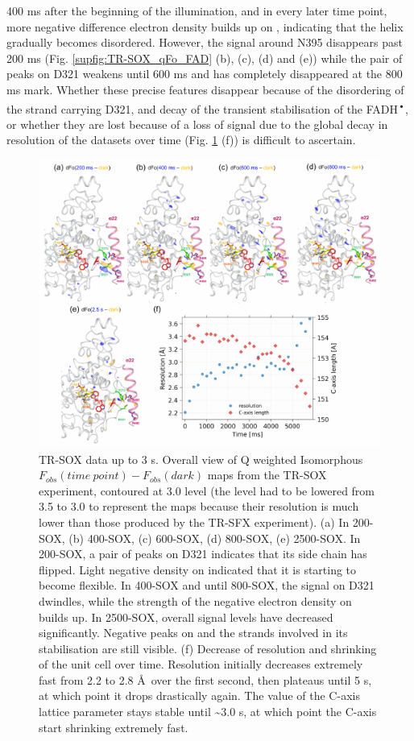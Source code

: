 400 ms after the beginning of the illumination, and in every later time point, more negative difference electron density builds up on , indicating that the helix gradually becomes disordered. However, the signal around N395 disappears past 200 ms (Fig. \ref{supfig:TR-SOX_qFo_FAD} (b), (c), (d) and (e)) while the pair of peaks on D321 weakens until 600 ms and has completely disappeared at the 800 ms mark. Whether these precise features disappear because of the disordering of the strand carrying D321, and decay of the transient stabilisation of the FADH\textsuperscript{•}, or whether they are lost because of a loss of signal due to the global decay in resolution of the datasets over time (Fig. \ref{fig:TR-SOX_qFo} (f)) is difficult to ascertain. 

\begin{figure}[H]
  \centering
  \includegraphics[width=\textwidth]{images/cracry/TR-SOX_qFo.pdf}
  \hfill
  \caption{TR-SOX data up to 3 s. Overall view of Q weighted \parencite{bourgeoisNewProcessingTools1999, dezitterXtrapol8EnablesAutomatic2022} Isomorphous \(F_{obs}(time\ point) - F_{obs}(dark)\) maps from the TR-SOX experiment, contoured at 3.0 \textsigma level (the \textsigma level had to be lowered from 3.5 to 3.0 to represent the maps because their resolution is much lower than those produced by the TR-SFX experiment). (a) In 200-SOX, (b) 400-SOX, (c) 600-SOX, (d) 800-SOX, (e) 2500-SOX.  In 200-SOX, a pair of peaks on D321 indicates that its side chain has flipped. Light negative density on  indicated that it is starting to become flexible. In 400-SOX and until 800-SOX, the signal on D321 dwindles, while the strength of the negative electron density on  builds up. In 2500-SOX, overall signal levels have decreased significantly. Negative peaks on  and the strands involved in its stabilisation are still visible. (f) Decrease of resolution and shrinking of the unit cell over time. Resolution initially decreases extremely fast from 2.2 to 2.8 \AA\ over the first second, then plateaus until 5 s, at which point it drops drastically again. The value of the C-axis lattice parameter stays stable until \textasciitilde3.0 s, at which point the C-axis start shrinking extremely fast.}\label{fig:TR-SOX_qFo}

\end{figure}
